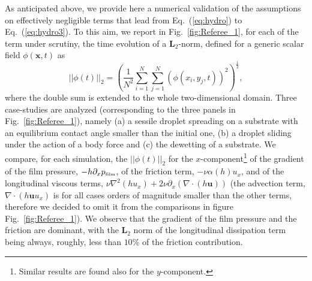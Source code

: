 As anticipated above, we provide here a numerical validation of the assumptions on
effectively negligible terms that lead from Eq.~(\ref{eq:hydro}) to Eq.~(\ref{eq:hydro3}). 
To this aim, we report in Fig.~\ref{fig:Referee_1}, for each of the term under scrutiny, 
the time evolution of a $\mathbf{L}_2$-norm, defined for a generic scalar field $\phi(\mathbf{x},t)$ as 
\begin{equation}\label{eq:magnitude}
||\phi(t)||_2 = \left(\frac{1}{N^2}\sum_{i=1}^{N}\sum_{j=1}^{N}\left(\phi(x_i,y_j,t)\right)^2\right)^{\frac{1}{2}},
\end{equation}
where the double sum is extended to the whole two-dimensional domain. Three case-studies are analyzed
(corresponding to the three panels in Fig.~\ref{fig:Referee_1}), namely
(a) a sessile droplet spreading on a substrate with an equilibrium contact angle smaller than the initial one, 
(b) a droplet sliding under the action of a body force and (c) the dewetting of a substrate. 
We compare, for each simulation, the $||\phi(t)||_2$ for the $x$-component\footnote{Similar results are found also 
for the $y$-component.} of the gradient of the film pressure, $-h\partial_x p_{\mbox{\tiny{film}}}$, 
of the friction term, $-\nu \alpha(h) u_x$, and of the longitudinal viscous terms, 
$\nu \nabla^2 (h u_x) + 2\nu \partial_x (\nabla \cdot (h\mathbf{u}))$
(the advection term, $\nabla \cdot (h \mathbf{u}u_x)$ 
is for all cases orders of magnitude smaller than the other terms, therefore we decided to omit it from the comparisons 
in figure Fig.~\ref{fig:Referee_1}).
We observe
that the gradient of the film pressure and the friction are dominant, with the $\mathbf{L}_2$ norm of the longitudinal dissipation term being always, roughly, less than $10\%$ of the friction contribution.